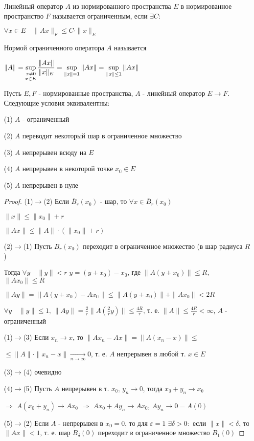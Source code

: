 \documentclass[a4paper,12pt]{report}
\newcommand*{\hm}[1]{#1\nobreak\discretionary{}%
            {\hbox{$\mathsurround=0pt #1$}}{}}
\begin{document}
\begin{df} Линейный оператор $A$ из нормированного пространства $E$ в нормированное пространство $F$ называется ограниченным, если $\exists C\colon$ 

$\forall x\in E\quad\|Ax\|_F\le C\cdot\|x\|_E$

Нормой ограниченного оператора $A$ называется

 $\|A\|=\sup\limits_{\substack{x\ne0\\x\in E}}\displaystyle\frac{\|Ax\|}{\|x\|_E}=\sup\limits_{\|x\|=1}\|Ax\|\hm=\sup\limits_{\|x\|\le1}\|Ax\|$
\end{df}


\begin{thm}
 Пусть $E,F$ - нормированные пространства, $A$ - линейный оператор $E\to F$. Следующие условия эквивалентны:

(1) $A$ - ограниченный

(2) $A$ переводит некоторый шар в ограниченное множество

(3) $A$ непрерывен всюду на $E$

(4) $A$ непрерывен в некоторой точке $x_0\in E$

(5) $A$ непрерывен в нуле
\end{thm}
\begin{proof} (1)$\to$(2) Если $\bar B_r(x_0)$ - шар, то $\forall x\in\bar B_r(x_0)$ 

$\|x\|\le\|x_0\|+r$

$\|Ax\|\le\|A\|\cdot(\|x_0\|+r)$

(2)$\to$(1) Пусть $B_r(x_0)$ переходит в ограниченное множество (в шар радиуса $R$)

Тогда $\forall y\quad\|y\|<r$ $y=(y+x_0)-x_0$, где $\|A(y+x_0)\|\le R$, $\|Ax_0\|\le R$

$\|Ay\|=\|A(y+x_0)-Ax_0\|\le\|A(y+x_0)\|+\|Ax_0\|<2R$

$\forall y\quad \|y\|\le1$, $\|Ay\|=\displaystyle\frac2r\|A\left(\frac2r y\right)\|\le\frac{4R}{r}$, т. е. $\|A\|\le\displaystyle\frac{4R}{r}<\infty$, $A$ - ограниченный

(1)$\to$(3) Если $x_n\to x$, то $\|Ax_n-Ax\|=\|A(x_n-x)\|\le$

\noindent$\le\|A\|\cdot\|x_n-x\|\xrightarrow[n\to\infty]{}0$, т. е. $A$ непрерывен в любой т. $x\in E$

(3)$\to$(4) очевидно

(4)$\to$(5) Пусть $A$ непрерывен в т. $x_0$, $y_n\to0$, тогда $x_0+y_n\to x_0$ 

$\Rightarrow$ $A(x_0+y_n)\to Ax_0$ $\Rightarrow$ $Ax_0+Ay_n\to Ax_0$, $Ay_n\to0=A(0)$

(5)$\to$(2) Если $A$ - непрерывен в $x_0=0$, то для $\varepsilon=1$ $\exists\delta>0\colon$ если $\|x\|<\delta$, то $\|Ax\|<1$, т. е. шар $B_\delta(0)$ переходит в ограниченное множество $B_1(0)$ 
\end{proof}
\end{document}
